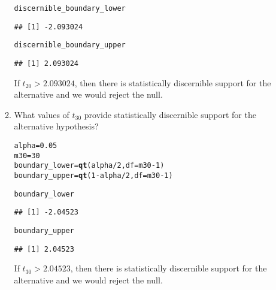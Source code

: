 \documentclass{article}\usepackage[]{graphicx}\usepackage[]{xcolor}
\makeatletter
\newcommand{\hlnum}[1]{\textcolor[rgb]{0.686,0.059,0.569}{#1}}%
\newcommand{\hlopt}[1]{\textcolor[rgb]{0,0,0}{#1}}%
\newcommand{\hldef}[1]{\textcolor[rgb]{0.345,0.345,0.345}{#1}}%
\newcommand{\hlkwb}[1]{\textcolor[rgb]{0.69,0.353,0.396}{#1}}%
\newcommand{\hlkwc}[1]{\textcolor[rgb]{0.333,0.667,0.333}{#1}}%
\newcommand{\hlkwd}[1]{\textcolor[rgb]{0.737,0.353,0.396}{\textbf{#1}}}%
\newenvironment{kframe}{%
 \def\at@end@of@kframe{}%
 \ifinner\ifhmode%
  \def\at@end@of@kframe{\end{minipage}}%
  \begin{minipage}{\columnwidth}%
 \fi\fi%
 \def\FrameCommand##1{\hskip\@totalleftmargin \hskip-\fboxsep
 \colorbox{shadecolor}{##1}\hskip-\fboxsep
     \hskip-\linewidth \hskip-\@totalleftmargin \hskip\columnwidth}%
 \MakeFramed {\advance\hsize-\width
   \@totalleftmargin\z@ \linewidth\hsize
   \@setminipage}}%
 {\par\unskip\endMakeFramed%
 \at@end@of@kframe}
\newenvironment{knitrout}{}{} %
\makeatother
\begin{document}
\begin{enumerate}
\begin{enumerate}
\begin{knitrout}
\begin{kframe}
\begin{alltt}
\hldef{discernible_boundary_lower}
\end{alltt}
\begin{verbatim}
## [1] -2.093024
\end{verbatim}
\begin{alltt}
\hldef{discernible_boundary_upper}
\end{alltt}
\begin{verbatim}
## [1] 2.093024
\end{verbatim}
\end{kframe}
\end{knitrout}
  
  If $t_{20} > 2.093024$, then there is statistically discernible support for the alternative and we would reject the null.
  
  \item What values of $t_{30}$ provide statistically discernible support for the
  alternative hypothesis?
\begin{knitrout}
\color{fgcolor}\begin{kframe}
\begin{alltt}
\hldef{alpha} \hlkwb{=} \hlnum{0.05}
\hldef{m30} \hlkwb{=} \hlnum{30}
\hldef{boundary_lower} \hlkwb{=} \hlkwd{qt}\hldef{(alpha}\hlopt{/}\hlnum{2}\hldef{,} \hlkwc{df} \hldef{= m30}\hlopt{-}\hlnum{1}\hldef{)}
\hldef{boundary_upper} \hlkwb{=} \hlkwd{qt}\hldef{(}\hlnum{1}\hlopt{-}\hldef{alpha}\hlopt{/}\hlnum{2}\hldef{,} \hlkwc{df} \hldef{= m30}\hlopt{-}\hlnum{1}\hldef{)}

\hldef{boundary_lower}
\end{alltt}
\begin{verbatim}
## [1] -2.04523
\end{verbatim}
\begin{alltt}
\hldef{boundary_upper}
\end{alltt}
\begin{verbatim}
## [1] 2.04523
\end{verbatim}
\end{kframe}
\end{knitrout}
  If $t_{30} > 2.04523$, then there is statistically discernible support for the alternative and we would reject the null.
  

\end{enumerate}
\end{enumerate}
\end{document}
